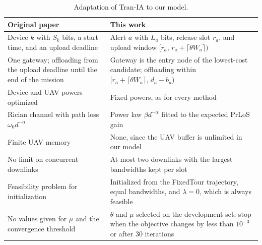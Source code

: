 \begin{table}[htbp]
\centering
\small
\caption{Adaptation of Tran-IA to our model.}
\label{tab:tran-adaptation}
\begin{tabularx}{\textwidth}{@{}>{\raggedright\arraybackslash}p{}>{\raggedright\arraybackslash}X@{}}
\toprule
\textbf{Original paper} & \textbf{This work} \\
\midrule
Device $k$ with $S_k$ bits, a start time, and an upload deadline & Alert $a$ with $L_a$ bits, release slot $r_a$, and upload window $[r_a,\,r_a+\lceil\theta W_a\rceil)$ \\
One gateway; offloading from the upload deadline until the end of the mission & Gateway is the entry node of the lowest-cost candidate; offloading within $[r_a+\lceil\theta W_a\rceil,\,d_a-b_a)$ \\
Device and UAV powers optimized & Fixed powers, as for every method \\
Rician channel with path loss $\omega_0 d^{-\alpha}$ & Power law $\beta d^{-\alpha}$ fitted to the expected PrLoS gain \\
Finite UAV memory & None, since the UAV buffer is unlimited in our model \\
No limit on concurrent downlinks & At most two downlinks with the largest bandwidths kept per slot \\
Feasibility problem for initialization & Initialized from the FixedTour trajectory, equal bandwidths, and $\lambda=0$, which is always feasible \\
No values given for $\mu$ and the convergence threshold & $\theta$ and $\mu$ selected on the development set; stop when the objective changes by less than $10^{-3}$ or after 30 iterations \\
\bottomrule
\end{tabularx}
\end{table}
